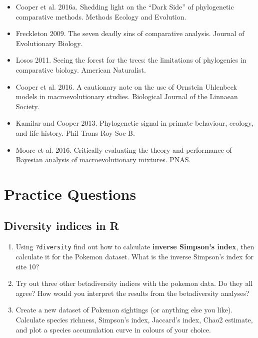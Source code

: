 \documentclass[]{book}
\providecommand{\tightlist}{%
  \setlength{\itemsep}{0pt}\setlength{\parskip}{0pt}}
\theoremstyle{definition}
\theoremstyle{definition}
\theoremstyle{definition}
\theoremstyle{remark}
\begin{document}
\begin{itemize}
\tightlist
\item
  Cooper et al. 2016a. Shedding light on the ``Dark Side'' of
  phylogenetic comparative methods. Methods Ecology and Evolution.
\item
  Freckleton 2009. The seven deadly sins of comparative analysis.
  Journal of Evolutionary Biology.
\item
  Losos 2011. Seeing the forest for the trees: the limitations of
  phylogenies in comparative biology. American Naturalist.
\item
  Cooper et al. 2016. A cautionary note on the use of Ornstein Uhlenbeck
  models in macroevolutionary studies. Biological Journal of the
  Linnaean Society.
\item
  Kamilar and Cooper 2013. Phylogenetic signal in primate behaviour,
  ecology, and life history. Phil Trans Roy Soc B.
\item
  Moore et al. 2016. Critically evaluating the theory and performance of
  Bayesian analysis of macroevolutionary mixtures. PNAS.
\end{itemize}

\chapter{Practice Questions}\label{practice-questions}

\section{Diversity indices in R}\label{diversity-indices-in-r-1}

\begin{enumerate}
\def\labelenumi{\arabic{enumi}.}
\tightlist
\item
  Using \texttt{?diversity} find out how to calculate \textbf{inverse
  Simpson's index}, then calculate it for the Pokemon dataset. What is
  the inverse Simpson's index for site 10?
\item
  Try out three other betadiversity indices with the pokemon data. Do
  they all agree? How would you interpret the results from the
  betadiversity analyses?
\item
  Create a new dataset of Pokemon sightings (or anything else you like).
  Calculate species richness, Simpson's index, Jaccard's index, Chao2
  estimate, and plot a species accumulation curve in colours of your
  choice.
\end{enumerate}
\end{document}
